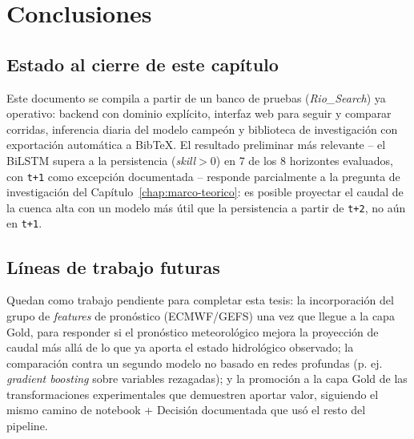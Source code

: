\chapter{Conclusiones}
\label{chap:conclusiones}

\section{Estado al cierre de este cap\'itulo}

Este documento se compila a partir de un banco de pruebas (\emph{Rio\_Search}) ya operativo:
backend con dominio expl\'icito, interfaz web para seguir y comparar corridas, inferencia diaria
del modelo campe\'on y biblioteca de investigaci\'on con exportaci\'on autom\'atica a BibTeX. El
resultado preliminar m\'as relevante -- el BiLSTM supera a la persistencia (\emph{skill}$>0$) en
7 de los 8 horizontes evaluados, con \texttt{t+1} como excepci\'on documentada -- responde
parcialmente a la pregunta de investigaci\'on del Cap\'itulo~\ref{chap:marco-teorico}: es posible
proyectar el caudal de la cuenca alta con un modelo m\'as \'util que la persistencia a partir de
\texttt{t+2}, no a\'un en \texttt{t+1}.

\section{L\'ineas de trabajo futuras}

Quedan como trabajo pendiente para completar esta tesis: la incorporaci\'on del grupo de
\emph{features} de pron\'ostico (ECMWF/GEFS) una vez que llegue a la capa Gold, para responder si
el pron\'ostico meteorol\'ogico mejora la proyecci\'on de caudal m\'as all\'a de lo que ya aporta
el estado hidrol\'ogico observado; la comparaci\'on contra un segundo modelo no basado en redes
profundas (p. ej. \emph{gradient boosting} sobre variables rezagadas); y la promoci\'on a la capa
Gold de las transformaciones experimentales que demuestren aportar valor, siguiendo el mismo
camino de notebook + Decisi\'on documentada que us\'o el resto del pipeline.
